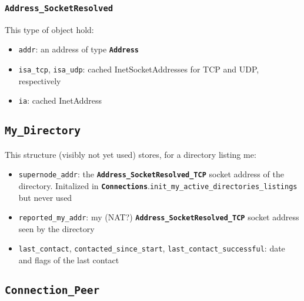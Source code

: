 \documentclass{book}
\newcommand{\cls}[1]{{\tt\bf #1}}
\newcommand{\mth}[1]{{\tt #1}}
\newcommand{\mmb}[1]{{\tt #1}}
\begin{document}
\subsubsection{\cls{Address\_SocketResolved}}

This type of object hold:
\begin{itemize}
\item
\mmb{addr}: an address of type \cls{Address}
\item
\mmb{isa\_tcp}, \mmb{isa\_udp}:  cached InetSocketAddresses for TCP and UDP, respectively
\item
\mmb{ia}:  cached InetAddress
\end{itemize}

\subsection{\cls{My\_Directory}}
This structure (visibly not yet used) stores, for a directory listing me:
\begin{itemize}
\item
\mmb{supernode\_addr}: the \cls{Address\_SocketResolved\_TCP} socket address of the directory. Initalized in \cls{Connections}.\mth{init\_my\_active\_directories\_listings} but never used
\item
\mmb{reported\_my\_addr}: my (NAT?) \cls{Address\_SocketResolved\_TCP} socket address seen by the directory
\item
  \mmb{last\_contact}, \mmb{contacted\_since\_start}, \mmb{last\_contact\_successful}: date and flags of the last contact

\end{itemize}

\subsection{\cls{Connection\_Peer}}
\end{document}

